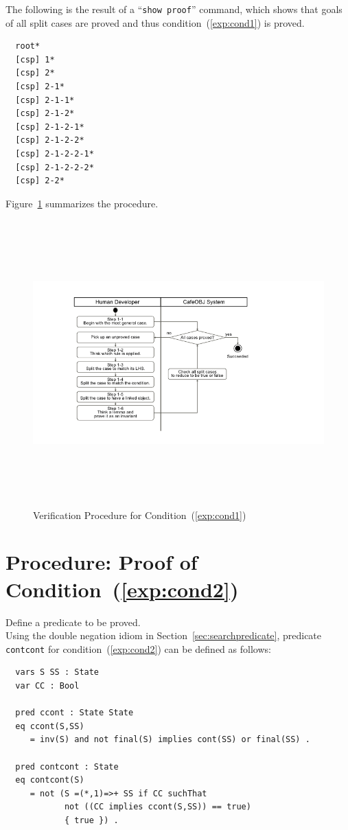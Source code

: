 \documentclass[12pt]{report}
\newcommand{\stt}[1]{{\small{\tt {#1}}}}
\begin{document}
The following is the result of a ``\stt{show proof}'' command, which shows
that goals of all split cases are proved and thus
condition~(\ref{exp:cond1}) is proved.
\small
\begin{verbatim}
  root*
  [csp] 1*
  [csp] 2*
  [csp] 2-1*
  [csp] 2-1-1*
  [csp] 2-1-2*
  [csp] 2-1-2-1*
  [csp] 2-1-2-2*
  [csp] 2-1-2-2-1*
  [csp] 2-1-2-2-2*
  [csp] 2-2*
\end{verbatim}
\normalsize

Figure~\ref{fig:procedure1} summarizes the procedure.
\begin{figure}
\centering
\includegraphics[height=11cm,natwidth=720,natheight=405,clip,trim=100 55 190 40]{procedure1.png}
\caption{Verification Procedure for Condition~(\ref{exp:cond1})}
\label{fig:procedure1}
\end{figure}

\section{Procedure: Proof of Condition~(\ref{exp:cond2})}
\label{sec:contcont}
 Define a predicate to be proved. \\ Using the
double negation idiom in Section~\ref{sec:searchpredicate}, predicate
{\tt contcont} for condition~(\ref{exp:cond2}) can be defined as follows:
\small
\begin{verbatim}
  vars S SS : State
  var CC : Bool

  pred ccont : State State
  eq ccont(S,SS)
     = inv(S) and not final(S) implies cont(SS) or final(SS) .

  pred contcont : State
  eq contcont(S)
     = not (S =(*,1)=>+ SS if CC suchThat
            not ((CC implies ccont(S,SS)) == true)
            { true }) .
\end{verbatim}
\normalsize
\end{document}
